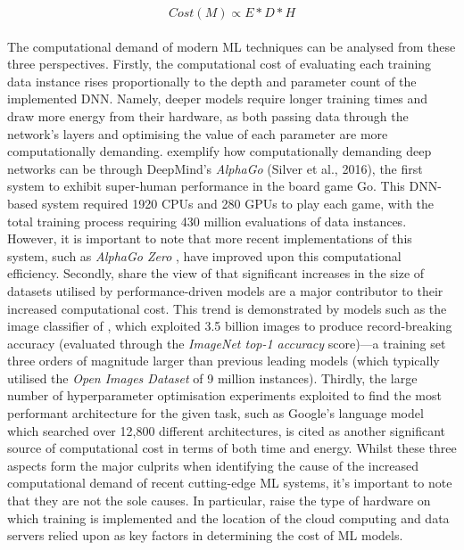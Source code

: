 \documentclass[a4paper, 12pt]{article}
\begin{document}
    \begin{equation}
        Cost(M) \propto E * D * H
        \label{eq:cost}
    \end{equation}
    \\
    The computational demand of modern ML techniques can be analysed from these three perspectives. Firstly, the computational cost of evaluating each training data instance rises proportionally to the depth and parameter count of the implemented DNN. Namely, deeper models require longer training times and draw more energy from their hardware, as both passing data through the network's layers and optimising the value of each parameter are more computationally demanding. \citet{schwartz-2019} exemplify how computationally demanding deep networks can be through DeepMind's \emph{AlphaGo} (Silver et al., 2016), the first system to exhibit super-human performance in the board game Go. This DNN-based system required 1920 CPUs and 280 GPUs to play each game, with the total training process requiring 430 million evaluations of data instances. However, it is important to note that more recent implementations of this system, such as \emph{AlphaGo Zero} \citep{silver-2017}, have improved upon this computational efficiency. Secondly, \citet{schwartz-2019} share the view of \citet{bender-2021} that significant increases in the size of datasets utilised by performance-driven models are a major contributor to their increased computational cost. This trend is demonstrated by models such as the image classifier of \citet{mahajan-2018}, which exploited 3.5 billion images to produce record-breaking accuracy (evaluated through the \emph{ImageNet top-1 accuracy} score)---a training set three orders of magnitude larger than previous leading models (which typically utilised the \emph{Open Images Dataset} of 9 million instances). Thirdly, the large number of hyperparameter optimisation experiments exploited to find the most performant architecture for the given task, such as Google's language model \citep{cer-2018} which searched over 12,800 different architectures, is cited as another significant source of computational cost in terms of both time and energy. Whilst these three aspects form the major culprits when identifying the cause of the increased computational demand of recent cutting-edge ML systems, it's important to note that they are not the sole causes. In particular, \citet{lacoste-2019} raise the type of hardware on which training is implemented and the location of the cloud computing and data servers relied upon as key factors in determining the cost of ML models.
\end{document}
